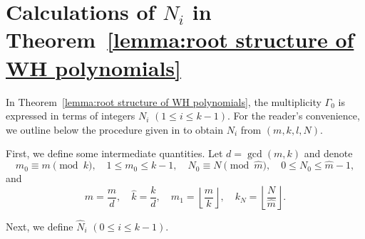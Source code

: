 \documentclass[preprint,3p,10pt]{elsarticle}
\theoremstyle{definition}
\begin{document}
\appendix




\section{Calculations of \texorpdfstring{\(N_i\)}{N\_i} in Theorem~\ref{lemma:root structure of WH polynomials}}
\label{app:Ni-procedure}
In Theorem~\ref{lemma:root structure of WH polynomials}, the multiplicity $\Gamma_0$ is expressed in terms of integers $N_i$ $(1\le i\le k-1)$.
For the reader's convenience, we outline below the procedure given in \cite{lin2024rogue} to obtain $N_i$ from $(m,k,l,N)$.


First, we define some intermediate quantities.
Let $d=\gcd(m,k)$ and denote
\begin{equation*}
    m_0\equiv m\pmod{k},\quad 1\leq m_0\leq k-1,
    \quad
    N_0\equiv N\pmod{\widehat m},\quad 0\leq N_0\leq\widehat m-1,
\end{equation*}
and
\begin{equation*}
   \widehat m=\frac{m}{d},
    \quad
    \widehat k=\frac{k}{d},
    \quad  m_1=\left\lfloor\frac{m}{k}\right\rfloor,
    \quad
    k_N=\left\lfloor\frac{N}{\widehat m}\right\rfloor.
\end{equation*}

Next, we define $\hat{N}_i$ $(0\leq i\leq k-1)$.
\end{document}
